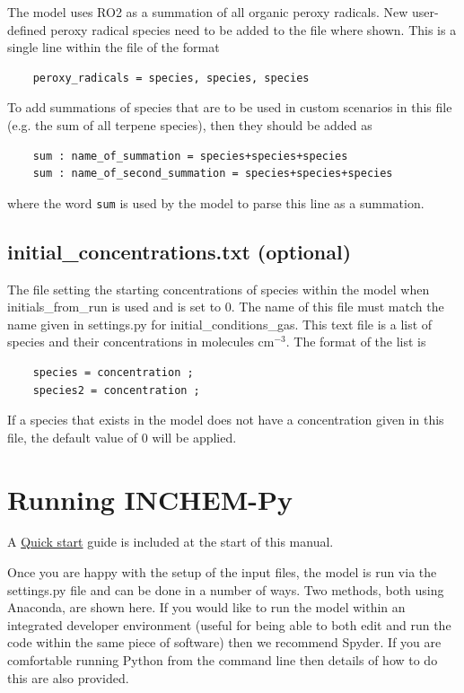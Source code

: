 \documentclass[a4paper]{refart}
\begin{document}
The model uses RO2 as a summation of all organic peroxy radicals. New user-defined peroxy radical species need to be added to the file where shown. This is a single line within the file of the format
\begin{verbatim}
    peroxy_radicals = species, species, species
\end{verbatim}

To add summations of species that are to be used in custom scenarios in this file (e.g. the sum of all terpene species), then they should be added as
\begin{verbatim}
    sum : name_of_summation = species+species+species
    sum : name_of_second_summation = species+species+species
\end{verbatim}
where the word \texttt{sum} is used by the model to parse this line as a summation.

\subsection{initial\_concentrations.txt (optional)}\label{initial_concentrations.txt}
The file setting the starting concentrations of species within the model when initials\_from\_run is used and is set to 0. The name of this file must match the name given in settings.py for initial\_conditions\_gas. This text file is a list of species and their concentrations in molecules cm$^{-3}$. The format of the list is
\begin{verbatim}
    species = concentration ;
    species2 = concentration ;
\end{verbatim}
If a species that exists in the model does not have a concentration given in this file, the default value of 0 will be applied. 

\newpage
\section{Running INCHEM-Py}
A \hyperref[Quick start]{Quick start} guide is included at the start of this manual. 

Once you are happy with the setup of the input files, the model is run via the settings.py file and can be done in a number of ways. Two methods, both using Anaconda, are shown here. If you would like to run the model within an integrated developer environment (useful for being able to both edit and run the code within the same piece of software) then we recommend Spyder. If you are comfortable running Python from the command line then details of how to do this are also provided.
\end{document}
